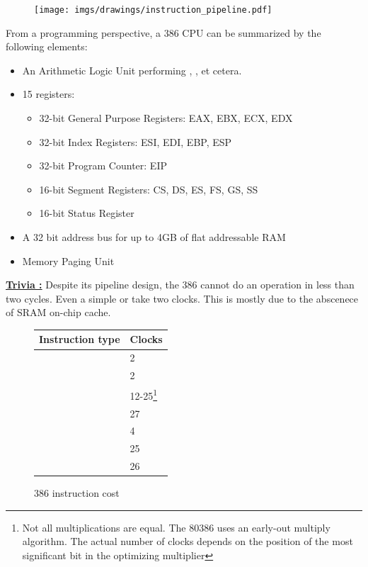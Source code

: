 \documentclass[book.tex]{subfiles}
\begin{document}
\begin{figure}[H]
\centering
\texttt{[image: imgs/drawings/instruction\_pipeline.pdf]}\\
\end{figure}
\par
From a programming perspective, a 386 CPU can be summarized by the following elements:
\begin{itemize}
\item An Arithmetic Logic Unit performing , ,  et cetera.
\item 15 registers:
\begin{itemize}
  \item 32-bit General Purpose Registers: EAX, EBX, ECX, EDX
  \item 32-bit Index Registers: ESI, EDI, EBP, ESP
  \item 32-bit Program Counter: EIP
  \item 16-bit Segment Registers: CS, DS, ES, FS, GS, SS
  \item 16-bit Status Register
\end{itemize}
\item A 32 bit address bus for up to 4GB of flat addressable RAM
\item Memory Paging Unit
\end{itemize}
 \par
 \textbf{\underline{Trivia :}} Despite its pipeline design, the 386 cannot do an operation in less than two cycles. Even a simple  or  take two clocks. This is mostly due to the abscenece of SRAM on-chip cache.\\
 \par
 

  \begin{figure}[H]
\centering  
\begin{tabularx}{\textwidth}{ X  Y }
  \toprule
  \textbf{Instruction type} &  \textbf{Clocks} \\
  \toprule 
    & 2  \\
    & 2  \\
    & 12-25\footnote{Not all multiplications are equal. The 80386 uses an early-out multiply algorithm. The actual number of clocks depends on the position of the most significant bit in the optimizing multiplier}  \\
    & 27 \\
    & 4 \\
    & 25 \\
    & 26 \\
  \toprule
\end{tabularx}
\caption{386 instruction cost\protect\footnotemark}
\end{figure}
\end{document}
